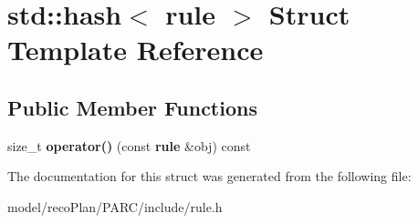 \section{std\+:\+:hash$<$ rule $>$ Struct Template Reference}
\label{structstd_1_1hash_3_01rule_01_4}
\subsection*{Public Member Functions}
\begin{DoxyCompactItemize}
\item 
\mbox{\label{structstd_1_1hash_3_01rule_01_4_a840ba7e533dcc8b1e8e9848659b496f6}} 
size\+\_\+t {\bfseries operator()} (const \textbf{ rule} \&obj) const
\end{DoxyCompactItemize}


The documentation for this struct was generated from the following file\+:\begin{DoxyCompactItemize}
\item 
model/reco\+Plan/\+P\+A\+R\+C/include/rule.\+h\end{DoxyCompactItemize}
